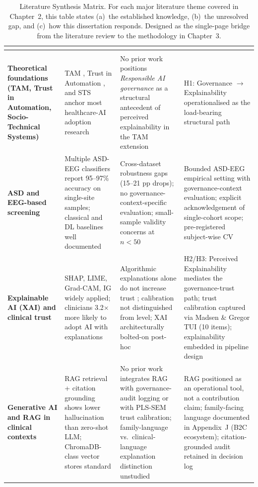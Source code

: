 {\tablestripes\tablefontsize
\begin{xltabular}{\textwidth}{@{} >{\bfseries}p{2.8cm} L L L @{}}
\caption[Literature Synthesis Matrix --- What is known / missing / how this study responds]{Literature Synthesis Matrix. For each major literature theme covered in Chapter~2, this table states (a)~the established knowledge, (b)~the unresolved gap, and (c)~how this dissertation responds. Designed as the single-page bridge from the literature review to the methodology in Chapter~3.}\label{tab:ch2_synthesis_matrix} \\
\toprule
{} &  &  &  \\
\midrule
\endfirsthead
\toprule
{} &  &  &  \\
\midrule
\endhead
\bottomrule
\endlastfoot
Theoretical foundations (TAM, Trust in Automation, Socio-Technical Systems) & TAM \cite{davis1989tam}, Trust in Automation \cite{lee2004trust}, and STS \cite{cherns1976principles} anchor most healthcare-AI adoption research & No prior work positions \emph{Responsible AI governance} as a structural antecedent of perceived explainability in the TAM extension & H1: Governance $\to$ Explainability operationalised as the load-bearing structural path \\
ASD and EEG-based screening & Multiple ASD-EEG classifiers report 95--97\% accuracy on single-site samples; classical and DL baselines well documented & Cross-dataset robustness gaps (15--21 pp drops); no governance-context-specific evaluation; small-sample validity concerns at $n < 50$ & Bounded ASD-EEG empirical setting with governance-context evaluation; explicit acknowledgement of single-cohort scope; pre-registered subject-wise CV \\
Explainable AI (XAI) and clinical trust & SHAP, LIME, Grad-CAM, IG widely applied; clinicians 3.2$\times$ more likely to adopt AI with explanations & Algorithmic explanations alone do not increase trust \cite{holzinger2022xai}; calibration not distinguished from level; XAI architecturally bolted-on post-hoc & H2/H3: Perceived Explainability mediates the governance-trust path; trust calibration captured via Madsen \& Gregor TUI (10 items); explainability embedded in pipeline design \\
Generative AI and RAG in clinical contexts & RAG retrieval + citation grounding shows lower hallucination than zero-shot LLM; ChromaDB-class vector stores standard & No prior work integrates RAG with governance-audit logging or with PLS-SEM trust calibration; family-language vs.\ clinical-language explanation distinction unstudied & RAG positioned as an operational tool, not a contribution claim; family-facing language documented in Appendix~J (B2C ecosystem); citation-grounded audit retained in decision log \\

\end{xltabular}}
